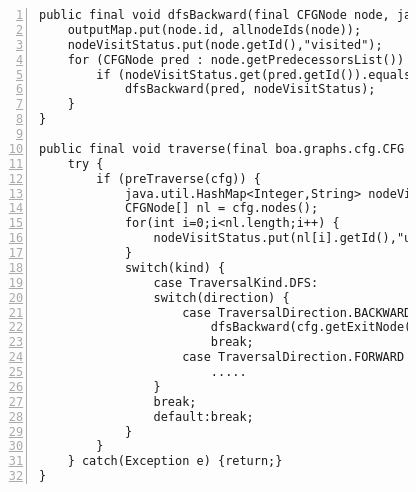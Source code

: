 \begin{figure}[ht!]
\begin{lstlisting}[numbers=left, tabsize=4, escapechar=@, caption={Implementation code of traversal without fixpoint.},label={lst:allNodeids}] 
public final void dfsBackward(final CFGNode node, java.util.HashMap<Integer,String> nodeVisitStatus) throws Exception {
	outputMap.put(node.id, allnodeIds(node));
	nodeVisitStatus.put(node.getId(),"visited");
	for (CFGNode pred : node.getPredecessorsList()) {
		if (nodeVisitStatus.get(pred.getId()).equals("unvisited"))
			dfsBackward(pred, nodeVisitStatus);
	}
}

public final void traverse(final boa.graphs.cfg.CFG cfg, final Traversal.TraversalDirection direction, final Traversal.TraversalKind kind) throws Exception {
	try {
		if (preTraverse(cfg)) {			
			java.util.HashMap<Integer,String> nodeVisitStatus=new java.util.HashMap<Integer,String>();
			CFGNode[] nl = cfg.nodes();
			for(int i=0;i<nl.length;i++) {
				nodeVisitStatus.put(nl[i].getId(),"unvisited");
			}
			switch(kind) {
				case TraversalKind.DFS:
				switch(direction) {
					case TraversalDirection.BACKWARD :
						dfsBackward(cfg.getExitNode(), nodeVisitStatus);
						break;
					case TraversalDirection.FORWARD :
						.....
				}
				break;					
				default:break;
			}
		}
	} catch(Exception e) {return;}
}
\end{lstlisting}
\end{figure}


